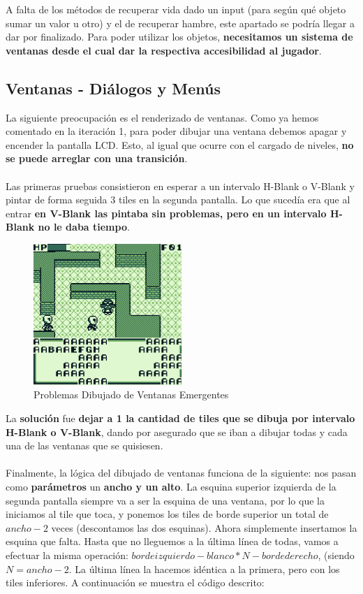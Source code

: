 A falta de los métodos de recuperar vida dado un input (para según qué objeto sumar un valor u otro) y el de recuperar hambre, este apartado se podría llegar a dar por finalizado. Para poder utilizar los objetos, \textbf{necesitamos un sistema de ventanas desde el cual dar la respectiva accesibilidad al jugador}.

\subsection{Ventanas - Diálogos y Menús}

La siguiente preocupación es el renderizado de ventanas. Como ya hemos comentado en la iteración 1, para poder dibujar una ventana debemos apagar y encender la pantalla LCD. Esto, al igual que ocurre con el cargado de niveles, \textbf{no se puede arreglar con una transición}.
\\ \\
Las primeras pruebas consistieron en esperar a un intervalo H-Blank o V-Blank y pintar de forma seguida 3 tiles en la segunda pantalla. Lo que sucedía era que al entrar \textbf{en V-Blank las pintaba sin problemas, pero en un intervalo H-Blank no le daba tiempo}.

\begin{figure}[h]
\centering
\includegraphics[width=0.5\textwidth]{include/images/desarrollo/windowproblems.png}
\caption{Problemas Dibujado de Ventanas Emergentes}
\label{figure:hudproblems}
\end{figure}

La \textbf{solución} fue \textbf{dejar a 1 la cantidad de tiles que se dibuja por intervalo H-Blank o V-Blank}, dando por asegurado que se iban a dibujar todas y cada una de las ventanas que se quisiesen.
\\ \\
Finalmente, la lógica del dibujado de ventanas funciona de la siguiente: nos pasan como \textbf{parámetros} un \textbf{ancho y un alto}. La esquina superior izquierda de la segunda pantalla siempre va a ser la esquina de una ventana, por lo que la iniciamos al tile que toca, y ponemos los tiles de borde superior un total de \(ancho-2\) veces (descontamos las dos esquinas). Ahora simplemente insertamos la esquina que falta. Hasta que no lleguemos a la última línea de todas, vamos a efectuar la misma operación: \(borde izquierdo - blanco*N - borde derecho\), (siendo \(N = ancho-2\). La última línea la hacemos idéntica a la primera, pero con los tiles inferiores. A continuación se muestra el código descrito:

